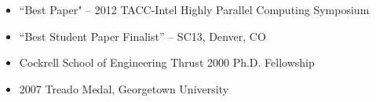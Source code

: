 \vspace{-0.3in}

\begin{itemize}
	\itemsep 0pt
	\item ``Best Paper" -- 2012 TACC-Intel Highly Parallel Computing
	      Symposium 
        \item ``Best Student Paper Finalist'' -- SC13, Denver, CO
        \item Cockrell School of Engineering Thrust 2000 Ph.D. Fellowship
        \item 2007 Treado Medal, Georgetown University      
\end{itemize}

